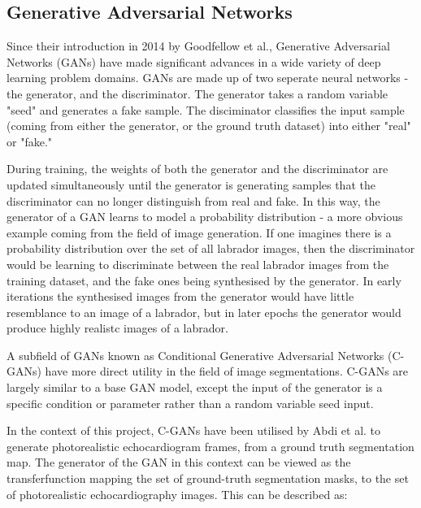 \subsection{Generative Adversarial Networks}

Since their introduction in 2014 by Goodfellow et al., Generative Adversarial
Networks (GANs) have made significant advances in a wide variety of deep learning
problem domains. GANs are made up of two seperate neural networks - the
generator, and the discriminator. The generator takes a random variable "seed"
and generates a fake sample. The disciminator classifies the input sample
(coming from either the generator, or the ground truth dataset) into either
"real" or "fake." \newline

During training, the weights of both the generator and the discriminator are
updated simultaneously until the generator is generating samples that the
discriminator can no longer distinguish from real and fake. In this way, the
generator of a GAN learns to model a probability distribution - a more obvious
example coming from the field of image generation. If one imagines
there is a probability distribution over the set of all labrador images, then the
discriminator would be learning to discriminate between the real labrador images
from the training dataset, and the fake ones being synthesised by the generator.
In early iterations the synthesised images from the generator would have little
resemblance to an image of a labrador, but in later epochs the generator would
produce highly realistc images of a labrador. \newline

A subfield of GANs known as Conditional Generative Adversarial Networks (C-GANs)
have more direct utility in the field of image segmentations. C-GANs are largely
similar to a base GAN model, except the input of the generator is a specific
condition or parameter rather than a random variable seed input. \newline

In the context of this project, C-GANs have been utilised by Abdi et al.
\cite{abdiGANenhancedConditionalEchocardiogram2019} to generate photorealistic  
echocardiogram frames, from a ground truth segmentation map. The generator of
the GAN in this context can be viewed as the transferfunction mapping the set of
ground-truth segmentation masks, to the set of photorealistic echocardiography
images. This can be described as: \newline

